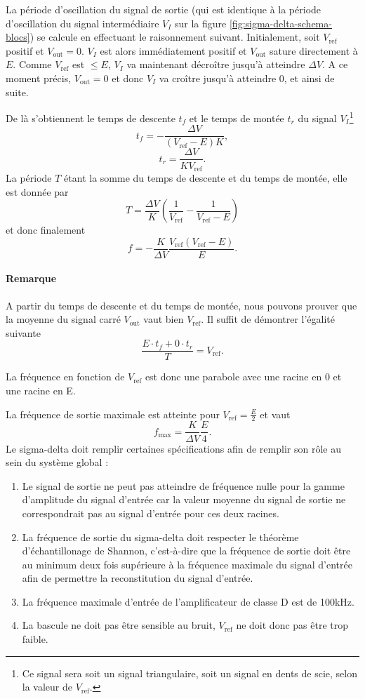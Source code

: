 La période d'oscillation du signal de sortie (qui est 
identique à la période d'oscillation du signal intermédiaire
$V_I$ sur la figure \ref{fig:sigma-delta-schema-blocs})
se calcule en effectuant le raisonnement suivant.
Initialement, soit $V_{\text{ref}}$ positif et
$V_{\text{out}} = 0$. $V_I$ est alors immédiatement positif
et $V_{\text{out}}$ sature directement à $E$. Comme $V_{\text{ref}}$
est $\leq E$, $V_I$ va maintenant décroître jusqu'à atteindre
$\Delta V$. A ce moment précis, $V_{\text{out}} = 0$
et donc $V_I$ va croître jusqu'à atteindre 0, et ainsi de suite.

De là s'obtiennent le temps de descente $t_f$ et le temps de montée $t_r$
du signal $V_I$\footnote{Ce signal sera soit un signal triangulaire,
soit un signal en dents de scie, selon la valeur de $V_{\text{ref}}$.}
\[ t_f = -\frac{\Delta V}{(V_{\text{ref}} - E)K},\]
\[ t_r = \frac{\Delta V}{KV_{\text{ref}}}.\]
La période $T$ étant la somme du temps de descente et du temps
de montée, elle est donnée par
\[ T = \frac{\Delta V}{K}\left(\frac{1}{V_{\text{ref}}} - \frac{1}{V_{\text{ref}} - E}\right) \]
et donc finalement
\begin{equation} 
	f = -\frac{K}{\Delta V} \frac{V_{\text{ref}}(V_{\text{ref}}-E)}{E}.
	\label{eq:sigma-delta-frequency}
\end{equation}

\paragraph{Remarque}
A partir du temps de descente et du temps de montée, nous
pouvons prouver que la moyenne du signal carré $V_{\text{out}}$
vaut bien $V_{\text{ref}}$. Il suffit de démontrer l'égalité
suivante
\[ \frac{E \cdot t_f + 0 \cdot t_r}{T} = V_{\text{ref}}.\]

La fréquence en fonction de $V_{\text{ref}}$ est donc
une parabole avec une racine en \unit{0}{\volt} et une
racine en \unit{E}{\volt}.

La fréquence de sortie maximale est atteinte pour 
$V_{\text{ref}} = \frac{E}{2}$ et vaut
\[ f_{\text{max}} = \frac{K}{\Delta V}\frac{E}{4}. \]
Le sigma-delta doit remplir certaines spécifications afin de remplir son rôle au sein du système global : \begin{enumerate}
\item Le signal de sortie ne peut pas atteindre de fréquence nulle pour la gamme d'amplitude du signal d'entrée car la valeur moyenne du signal de sortie ne correspondrait pas au signal d'entrée pour ces deux racines.
\item La fréquence de sortie du sigma-delta doit respecter le théorème d'échantillonage de Shannon, c'est-à-dire que la fréquence de sortie doit être au minimum deux fois supérieure à la fréquence maximale du signal d'entrée afin de permettre la reconstitution du signal d'entrée.
\item La fréquence maximale d'entrée de l'amplificateur de classe D est de 100kHz.
\item La bascule ne doit pas être sensible au bruit, $V_{\text{ref}}$ ne doit donc pas être trop faible.
\end{enumerate}

